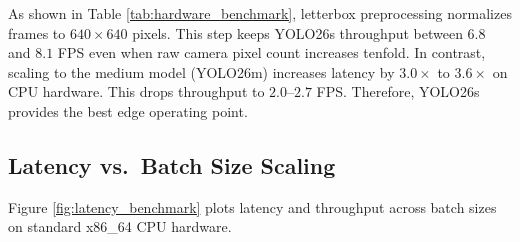 \begin{table}[htbp]
\centering
\caption{End-to-End Pipeline Latency and Throughput Across Four Clinical CCTV Resolutions on Consumer x86 CPU (Intel AVX2 Native)}
\label{tab:hardware_benchmark}
\end{table}

As shown in Table \ref{tab:hardware_benchmark}, letterbox preprocessing normalizes frames to $640 \times 640$ pixels. This step keeps YOLO26s throughput between $6.8$ and $8.1$ FPS even when raw camera pixel count increases tenfold. In contrast, scaling to the medium model (YOLO26m) increases latency by $3.0\times$ to $3.6\times$ on CPU hardware. This drops throughput to $2.0\text{--}2.7$ FPS. Therefore, YOLO26s provides the best edge operating point.

\subsection{Latency vs.\ Batch Size Scaling}
Figure \ref{fig:latency_benchmark} plots latency and throughput across batch sizes on standard x86\_64 CPU hardware.

